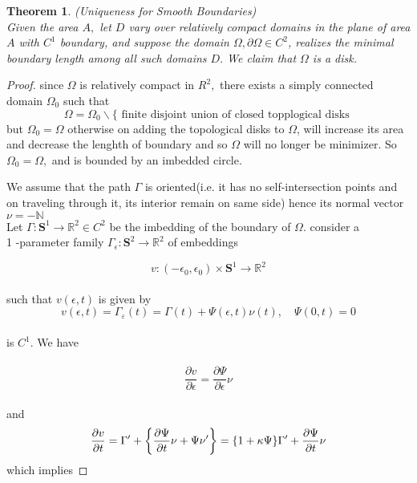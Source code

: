 \documentclass[oneside]{book}
\newtheorem{theorem}{Theorem}[section]
\begin{document}
\begin{theorem}
{(Uniqueness for Smooth Boundaries)}
\label{t:1} \\
 Given
the area $A,$ let $D$ vary over relatively compact domains in the plane of area $A$
with $C^{1}$ boundary, and suppose the domain $\Omega, \partial \Omega \in C^{2}$, realizes the minimal
boundary length among all such domains $D .$ We claim that $\Omega$ is a disk.
\end{theorem}


\begin{proof}

 since $\Omega$ is relatively compact in $R^{2},$ there exists a simply connected
domain $\Omega_{0}$ such that
$$
\Omega=\Omega_{0} \backslash\{\text{ finite disjoint union of closed topplogical disks 
} $$
 but $\Omega_{0}=\Omega $ otherwise on adding the
topological disks to $\Omega$, will increase its area  and decrease the lenghth of boundary and so $\Omega$ will no longer be minimizer. So $\Omega_{0}=\Omega,$ and is bounded by an imbedded circle.\par
We assume that the path $\Gamma$ is oriented(i.e. it has no self-intersection points and on traveling through it, its interior remain on same side) hence its normal vector $\nu = - \mathbb{N}$ \\


Let $\Gamma: \mathbf{S}^{1} \rightarrow \mathbb{R}^{2} \in C^{2}$ be the imbedding of the boundary of $\Omega .$ 
consider a \\
 1 -parameter family $\Gamma_{\epsilon}: \mathbf{S}^{2} \rightarrow \mathbb{R}^{2}$ of embeddings
\par
$$
v:\left(-\epsilon_{0}, \epsilon_{0}\right) \times \mathbf{S}^{1} \rightarrow \mathbb{R}^{2}
$$ \\
such that  $v(\epsilon, t)$ is given by \\
    \begin{equation}
    \label{eq10}  
v(\epsilon, t)=\Gamma_{\varepsilon}(t)=\Gamma(t)+\Psi(\epsilon, t) \nu(t), \quad \Psi(0, t)=0
    \end{equation} \\
is $C^{1} .$ We have \\\\
  \begin{equation}
  \label{eq11}  
\frac{\partial v}{\partial \epsilon}=\frac{\partial \Psi}{\partial \epsilon} \nu
    \end{equation}
 \\ 
 and 
     \begin{equation}
     \label{eq12}  
    \\  \frac{\partial v}{\partial t}=\Gamma^{\prime}+\left\{\frac{\partial \Psi}{\partial t} \nu+\Psi \nu^{\prime}\right\}=\{1+\kappa \Psi\} \Gamma^{\prime}+\frac{\partial \Psi}{\partial t} \nu
                   \end{equation}    
which implies  


\end{proof}
\end{document}
